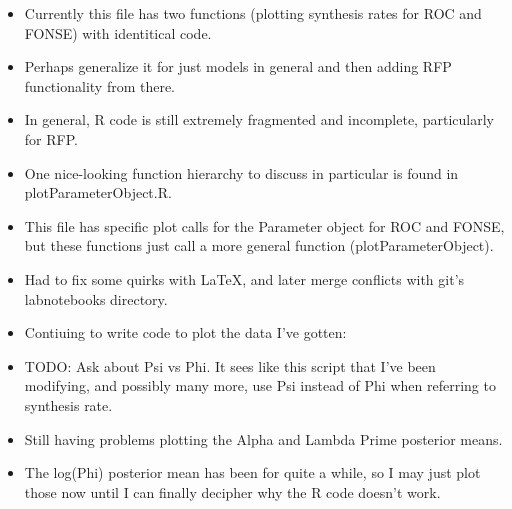 \documentclass[12pt,hyperref]{labbook}
\begin{document}
\begin{itemize}
    \item Currently this file has two functions (plotting synthesis rates for ROC and FONSE) with identitical code.
    \item Perhaps generalize it for just models in general and then adding RFP functionality from there.
    \item In general, R code is still extremely fragmented and incomplete, particularly for RFP.
    \item One nice-looking function hierarchy to discuss in particular is found in plotParameterObject.R.
    \item This file has specific plot calls for the Parameter object for ROC and FONSE, but these functions just call a more general function (plotParameterObject).
\end{itemize}


\begin{itemize}
    \item Had to fix some quirks with LaTeX, and later merge conflicts with git's labnotebooks directory.
    \item Contiuing to write code to plot the data I've gotten:
    \item TODO: Ask about Psi vs Phi. 
    It sees like this script that I've been modifying, and possibly many more, use Psi instead of Phi when referring to synthesis rate.
    \item Still having problems plotting the Alpha and Lambda Prime posterior means.
    \item The log(Phi) posterior mean has been for quite a while, so I may just plot those now until I can finally decipher why the R code doesn't work.
\end{itemize}

\end{document}
